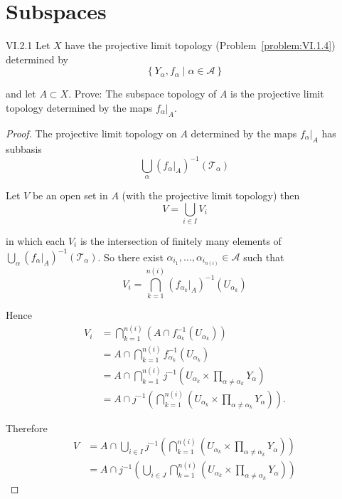 \section{Subspaces}

\begin{problem}{VI.2.1}
Let \(X\) have the projective limit topology (Problem~\ref{problem:VI.1.4}) determined by
\[
	\left\{ Y_{\alpha}, f_{\alpha} \mid \alpha \in \mathscr{A} \right\}
\]

and let \( A \subset X \). Prove: The subspace topology of \(A\) is the projective limit topology determined by the maps \( f_{\alpha}\vert_{A} \).
\end{problem}

\begin{proof}
	The projective limit topology on \( A \) determined by the maps \( f_{\alpha}\vert_{A} \) has subbasis
	\[
		\bigcup_{\alpha} {(f_{\alpha}\vert_{A})}^{-1}(\mathscr{T}_{\alpha})
	\]

	Let \( V \) be an open set in \( A \) (with the projective limit topology) then
	\[
		V = \bigcup_{i\in I} V_{i}
	\]

	in which each \( V_{i} \) is the intersection of finitely many elements of \( \bigcup_{\alpha} {(f_{\alpha}\vert_{A})}^{-1}(\mathscr{T}_{\alpha}) \). So there exist \( \alpha_{i_{1}}, \ldots, \alpha_{i_{n(i)}} \in \mathscr{A} \) such that
	\[
		V_{i} = \bigcap^{n(i)}_{k=1} {(f_{\alpha_{k}}\vert_{A})}^{-1}(U_{\alpha_{k}})
	\]

	Hence
	\begingroup
	\allowdisplaybreaks%
	\begin{align*}
		V_{i} & = \bigcap^{n(i)}_{k=1} (A \cap f_{\alpha_{k}}^{-1}(U_{\alpha_{k}}))                                                             \\
		      & = A \cap \bigcap^{n(i)}_{k=1} f_{\alpha_{k}}^{-1}(U_{\alpha_{k}})                                                               \\
		      & = A \cap \bigcap^{n(i)}_{k=1} j^{-1}\left( U_{\alpha_{k}} \times \prod_{\alpha \ne \alpha_{k}} Y_{\alpha} \right)               \\
		      & = A \cap j^{-1}\left( \bigcap^{n(i)}_{k=1} \left( U_{\alpha_{k}} \times \prod_{\alpha\ne\alpha_{k}} Y_{\alpha} \right) \right).
	\end{align*}
	\endgroup

	Therefore
	\begingroup
	\allowdisplaybreaks%
	\begin{align*}
		V & = A \cap \bigcup_{i\in I} j^{-1}\left( \bigcap^{n(i)}_{k=1} \left( U_{\alpha_{k}} \times \prod_{\alpha\ne\alpha_{k}} Y_{\alpha} \right) \right) \\
		  & = A \cap j^{-1}\left( \bigcup_{i\in J} \bigcap^{n(i)}_{k=1} \left( U_{\alpha_{k}} \times \prod_{\alpha\ne\alpha_{k}} Y_{\alpha} \right) \right)
	\end{align*}
	\endgroup


\end{proof}
